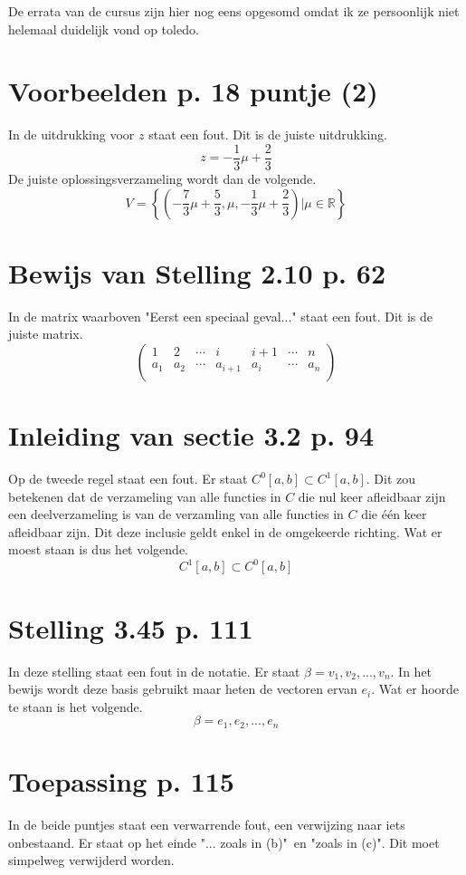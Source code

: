 \documentclass[lineaire_algebra_oplossingen.tex]{subfiles}
\begin{document}
\noindent De errata van de cursus zijn hier nog eens opgesomd omdat ik ze persoonlijk niet helemaal duidelijk vond op toledo.

\section{Voorbeelden p. 18 puntje (2)}
In de uitdrukking voor $z$ staat een fout. Dit is de juiste uitdrukking.
\[
z = -\frac{1}{3}\mu + \frac{2}{3}
\]
De juiste oplossingsverzameling wordt dan de volgende.
\[
V = \left\{\left(-\frac{7}{3}\mu+\frac{5}{3},\mu,-\frac{1}{3}\mu + \frac{2}{3}\right) | \mu \in \mathbb{R}\right\}
\]

\section{Bewijs van Stelling 2.10 p. 62}
In de matrix waarboven "Eerst een speciaal geval..." staat een fout. Dit is de juiste matrix.
\[
\begin{pmatrix}
1 & 2 & \cdots & i & i+1 & \cdots & n\\
a_1 & a_2 & \cdots & a_{i+1} & a_i & \cdots & a_n\\ 
\end{pmatrix}
\]

\section{Inleiding van sectie 3.2 p. 94}
Op de tweede regel staat een fout. Er staat $C^0[a,b] \subset C^1[a,b]$.
Dit zou betekenen dat de verzameling van alle functies in $C$ die nul keer afleidbaar zijn een deelverzameling is van de verzamling van alle functies in $C$ die \'e\'en keer afleidbaar zijn.
Dit deze inclusie geldt enkel in de omgekeerde richting. Wat er moest staan is dus het volgende.
\[
C^1[a,b] \subset C^0[a,b]
\]

\section{Stelling 3.45 p. 111}
In deze stelling staat een fout in de notatie. Er staat $\beta = v_1,v_2,...,v_n$.
In het bewijs wordt deze basis gebruikt maar heten de vectoren ervan $e_i$.
Wat er hoorde te staan is het volgende.
\[
\beta = e_1,e_2,...,e_n
\]

\section{Toepassing p. 115}
In de beide puntjes staat een verwarrende fout, een verwijzing naar iets onbestaand.
Er staat op het einde "... zoals in (b)"\ en "zoals in (c)".
Dit moet simpelweg verwijderd worden.
\end{document}
